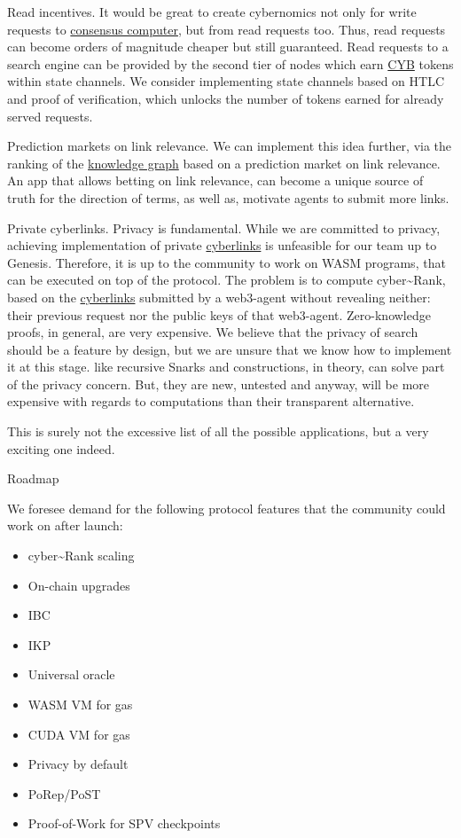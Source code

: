 \documentclass[8pt,oneside]{amsart}
\makeatletter
\newcommand{\linkgreen}[2]{\href{#1}{\color{green}{#2}}}
\renewcommand\subsection{\@startsection{subsection}
                                    {2}{\z@}
                                    {-3.25ex\@plus -1ex \@minus -.2ex}
                                    {0ex \@plus .2ex}
                                    {\play\Large}
                        }
\newcommand{\titleSection}[1]{\subsection{#1}}
\makeatother
\begin{document}
Read incentives. It would be great to create cybernomics not only for write requests to {\hyperref[consensus-computer]{consensus computer}}, but from read requests too. Thus, read requests can become orders of magnitude cheaper but still guaranteed. Read requests to a search engine can be provided by the second tier of nodes which earn {\hyperref[cyb]{CYB}} tokens within state channels. We consider implementing state channels based on HTLC and proof of verification, which unlocks the number of tokens earned for already served requests.

Prediction markets on link relevance. We can implement this idea further, via the ranking of the {\hyperref[knowledge-graph]{knowledge graph}} based on a prediction market on link relevance. An app that allows betting on link relevance, can become a unique source of truth for the direction of terms, as well as, motivate agents to submit more links.

Private cyberlinks. Privacy is fundamental. While we are committed to privacy, achieving implementation of private {\hyperref[cyberlinks]{cyberlinks}} is unfeasible for our team up to Genesis. Therefore, it is up to the community to work on WASM programs, that can be executed on top of the protocol. The problem is to compute cyber\~{}Rank, based on the {\hyperref[cyberlinks]{cyberlinks}} submitted by a web3-agent without revealing neither: their previous request nor the public keys of that web3-agent. Zero-knowledge proofs, in general, are very expensive. We believe that the privacy of search should be a feature by design, but we are unsure that we know how to implement it at this stage. \linkgreen{https://ipfs.io/ipfs/Qmdje3AmtsfjX9edWAxo3LFhV9CTAXoUvwGR7wHJXnc2Gk}{Coda} like recursive Snarks and \linkgreen{https://ipfs.io/ipfs/Qmd99xmraYip9cVv8gRMy6Y97Bkij8qUYArGDME7CzFasg}{MimbleWimble} constructions, in theory, can solve part of the privacy concern. But, they are new, untested and anyway, will be more expensive with regards to computations than their transparent alternative.

This is surely not the excessive list of all the possible applications, but a very exciting one indeed.

\titleSection{Roadmap}\label{roadmap}

We foresee demand for the following protocol features that the community could work on after launch:

\begin{itemize}
\item cyber\~{}Rank scaling
\item On-chain upgrades
\item IBC
\item IKP
\item Universal oracle
\item WASM VM for gas
\item CUDA VM for gas
\item Privacy by default
\item PoRep/PoST
\item Proof-of-Work for SPV checkpoints

\end{itemize}
\end{document}
